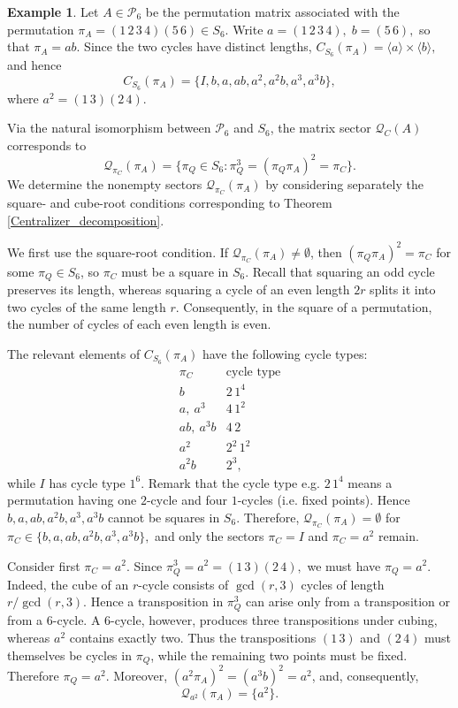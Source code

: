 \documentclass{article}
\theoremstyle{definition}\newtheorem{example}{Example}[section]
\def\Q{{\mathcal{Q}}}
\def\P{{\mathcal{P}}}
\begin{document}
	\begin{example}\label{Ex_4,2}
		Let $A\in\P_6$ be the permutation matrix associated with the permutation $\pi_A=(1\,2\,3\,4)(5\,6)\in S_6.$ Write $a=(1\,2\,3\,4),\;b=(5\,6),$
		so that $\pi_A=ab$. Since the two cycles have distinct lengths,
		$C_{S_6}(\pi_A)=\langle a\rangle\times\langle b\rangle,$
		and hence
		$$
		C_{S_6}(\pi_A)=\{I,b,a,ab,a^2,a^2b,a^3,a^3b\},
		$$
		where $a^2=(1\,3)(2\,4).$
		
		Via the natural isomorphism between $\mathcal P_6$ and $S_6$, the matrix
		sector $\mathcal Q_C(A)$ corresponds to
		$$
		\mathcal Q_{\pi_C}(\pi_A)=\{\pi_Q\in S_6:\pi_Q^3=(\pi_Q\pi_A)^2=\pi_C\}.
		$$
		We determine the nonempty sectors $\Q_{\pi_C}(\pi_A)$ by considering separately the square- and cube-root conditions corresponding to Theorem \ref{Centralizer_decomposition}.
		
		We first use the square-root condition. If $\Q_{\pi_C}(\pi_A)\neq\emptyset$, then $(\pi_Q \pi_A)^2=\pi_C$ for some $\pi_Q\in S_6$, so $\pi_C$ must be a square in $S_6$.
		Recall that squaring an odd cycle preserves its length, whereas
		squaring a cycle of an even length $2r$ splits it into two cycles of the same
		length $r$. Consequently, in the square of a permutation, the number
		of cycles of each even length is even.
		
		The relevant elements of $C_{S_6}(\pi_A)$ have the following cycle types:
		$$
		\begin{array}{c|c}
			\pi_C & \text{cycle type}\\
			\hline
			b & 2\,1^4\\
			a,\ a^3 & 4\,1^2\\
			ab,\ a^3b & 4\,2\\
			a^2 & 2^2\,1^2\\
			a^2b & 2^3,
		\end{array}
		$$
		while $I$ has cycle type $1^6$. Remark that the cycle type e.g. $2\,1^4$ means a permutation having one $2$-cycle and four $1$-cycles (i.e. fixed points). Hence $b, a, ab, a^2b, a^3, a^3b$ cannot be squares in $S_6$. Therefore, $\Q_{\pi_C}(\pi_A)=\emptyset$ for
		$\pi_C\in\{b,a,ab,a^2b,a^3,a^3b\},$ and only the sectors $\pi_C=I$ and $\pi_C=a^2$ remain.
		
		Consider first $\pi_C=a^2$. Since $\pi_Q^3=a^2=(1\,3)(2\,4),$ we must have $\pi_Q=a^2$. Indeed, the cube of an $r$-cycle consists of $\gcd(r,3)$ cycles of length $r/\gcd(r,3)$. Hence a transposition in $\pi_Q^3$ can arise only from a transposition or from a $6$-cycle. A $6$-cycle, however, produces three transpositions under cubing, whereas $a^2$ contains exactly two. Thus the transpositions $(1\,3)$ and $(2\,4)$ must themselves be cycles in $\pi_Q$, while the remaining two points must be fixed. Therefore $\pi_Q=a^2$. Moreover, $(a^2\pi_A)^2=(a^3b)^2=a^2$, and, consequently,
		$$
		\Q_{a^2}(\pi_A)=\{a^2\}.
		$$
		

\end{example}
\end{document}
